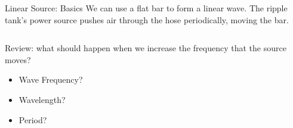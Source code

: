 \documentclass{beamer}
\begin{document}
\begin{frame}{Linear Source: Basics}
    We can use a flat bar to form a linear wave. The ripple tank's power source pushes air through the hose periodically, moving the bar. 
    
    \begin{columns}[T]
         \begin{column}{.6\textwidth}
            Review: what should happen when we increase the frequency that the source moves? 
            \begin{itemize}
                \item Wave Frequency?
                \item Wavelength?
                \item Period?
            \end{itemize}
         \end{column}
         \begin{column}{.3\textwidth}
         \end{column}
    \end{columns}
\end{frame}
\end{document}
